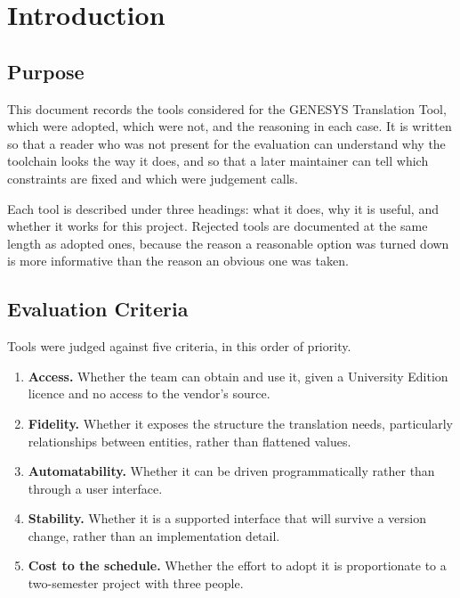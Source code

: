 \chapter{Introduction}
\label{ch:intro}

\section{Purpose}

This document records the tools considered for the GENESYS Translation Tool,
which were adopted, which were not, and the reasoning in each case. It is written
so that a reader who was not present for the evaluation can understand why the
toolchain looks the way it does, and so that a later maintainer can tell which
constraints are fixed and which were judgement calls.

Each tool is described under three headings: what it does, why it is useful, and
whether it works for this project. Rejected tools are documented at the same
length as adopted ones, because the reason a reasonable option was turned down is
more informative than the reason an obvious one was taken.

\section{Evaluation Criteria}

Tools were judged against five criteria, in this order of priority.

\begin{enumerate}[nosep]
	\item \textbf{Access.} Whether the team can obtain and use it, given a
	      University Edition licence and no access to the vendor's source.
	\item \textbf{Fidelity.} Whether it exposes the structure the translation
	      needs, particularly relationships between entities, rather than flattened
	      values.
	\item \textbf{Automatability.} Whether it can be driven programmatically
	      rather than through a user interface.
	\item \textbf{Stability.} Whether it is a supported interface that will
	      survive a version change, rather than an implementation detail.
	\item \textbf{Cost to the schedule.} Whether the effort to adopt it is
	      proportionate to a two-semester project with three people.
\end{enumerate}

